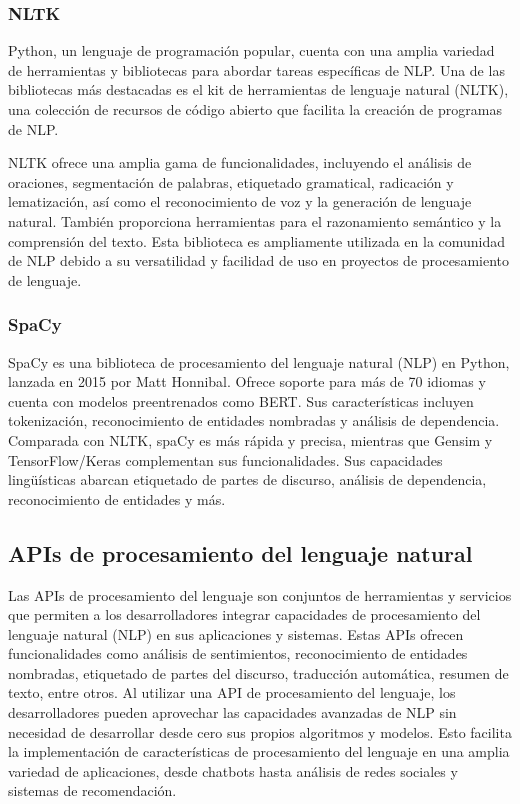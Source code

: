 \subsubsection{NLTK}
Python, un lenguaje de programación popular, cuenta con una amplia variedad de herramientas y bibliotecas para abordar tareas específicas de NLP. Una de las bibliotecas más destacadas es el kit de herramientas de lenguaje natural (NLTK), una colección de recursos de código abierto que facilita la creación de programas de NLP.

NLTK ofrece una amplia gama de funcionalidades, incluyendo el análisis de oraciones, segmentación de palabras, etiquetado gramatical, radicación y lematización, así como el reconocimiento de voz y la generación de lenguaje natural. También proporciona herramientas para el razonamiento semántico y la comprensión del texto. Esta biblioteca es ampliamente utilizada en la comunidad de NLP debido a su versatilidad y facilidad de uso en proyectos de procesamiento de lenguaje.
\subsubsection{SpaCy}
SpaCy es una biblioteca de procesamiento del lenguaje natural (NLP) en Python, lanzada en 2015 por Matt Honnibal. Ofrece soporte para más de 70 idiomas y cuenta con modelos preentrenados como BERT. Sus características incluyen tokenización, reconocimiento de entidades nombradas y análisis de dependencia. Comparada con NLTK, spaCy es más rápida y precisa, mientras que Gensim y TensorFlow/Keras complementan sus funcionalidades. Sus capacidades lingüísticas abarcan etiquetado de partes de discurso, análisis de dependencia, reconocimiento de entidades y más.
\subsection{APIs de procesamiento del lenguaje natural}
Las APIs de procesamiento del lenguaje son conjuntos de herramientas y servicios que permiten a los desarrolladores integrar capacidades de procesamiento del lenguaje natural (NLP) en sus aplicaciones y sistemas. Estas APIs ofrecen funcionalidades como análisis de sentimientos, reconocimiento de entidades nombradas, etiquetado de partes del discurso, traducción automática, resumen de texto, entre otros. Al utilizar una API de procesamiento del lenguaje, los desarrolladores pueden aprovechar las capacidades avanzadas de NLP sin necesidad de desarrollar desde cero sus propios algoritmos y modelos. Esto facilita la implementación de características de procesamiento del lenguaje en una amplia variedad de aplicaciones, desde chatbots hasta análisis de redes sociales y sistemas de recomendación.

